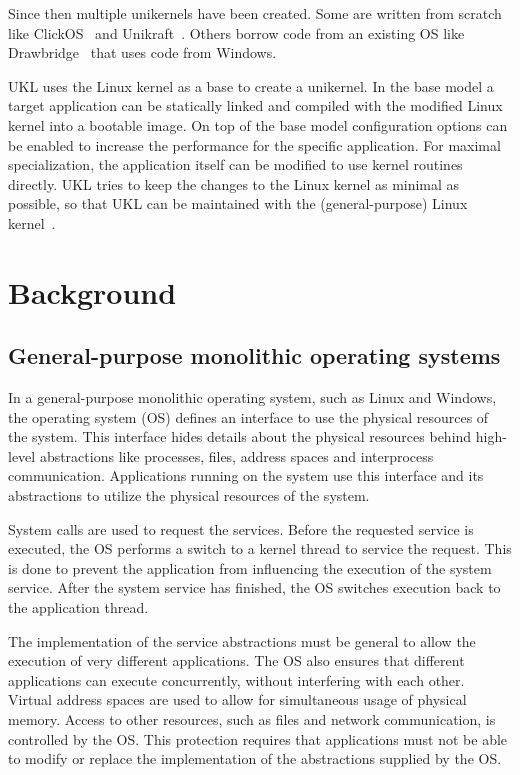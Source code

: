 \documentclass[10pt,twocolumn,a4paper]{article}
\begin{document}
  Since then multiple unikernels have been created. Some are written from scratch like
  ClickOS~\cite{martins2014} and Unikraft~\cite{kuenzer21}.
  Others borrow code from an existing OS like Drawbridge~\cite{porter11} 
  that uses code from Windows.

  UKL uses the Linux kernel as a base to create a unikernel.
  In the base model a target application can be statically linked and compiled with
  the modified Linux kernel into a bootable image.
  On top of the base model configuration options can be enabled to increase the performance
  for the specific application.
  For maximal specialization, the application itself can be modified to use kernel routines
  directly.
  UKL tries to keep the changes to the Linux kernel as minimal as possible,
  so that UKL can be maintained with the (general-purpose) Linux kernel~\cite{raza23}.
  

\section{Background}\label{sec:background}
  \subsection{General-purpose monolithic operating systems}
    In a general-purpose monolithic operating system, such as Linux and Windows,
    the operating system (OS) defines an interface to use the physical resources
    of the system. 
    This interface hides details about the physical resources behind
    high-level abstractions like processes, files, address spaces 
    and interprocess communication.
    Applications running on the system use this interface and its abstractions
    to utilize the physical resources of the system.

    System calls are used to request the services.
    Before the requested service is executed, the OS performs a switch to a kernel thread
    to service the request.
    This is done to prevent the application from influencing the execution of the system service.
    After the system service has finished, the OS switches execution back to the application thread.

    The implementation of the service abstractions must be general to allow the execution 
    of very different applications.
    The OS also ensures that different applications can execute concurrently, 
    without interfering with each other. 
    Virtual address spaces are used to allow for simultaneous usage of physical memory.
    Access to other resources, such as files and network communication, is controlled
    by the OS.
    This protection requires that applications must not be able
    to modify or replace the implementation of the abstractions supplied by the OS.
\end{document}
